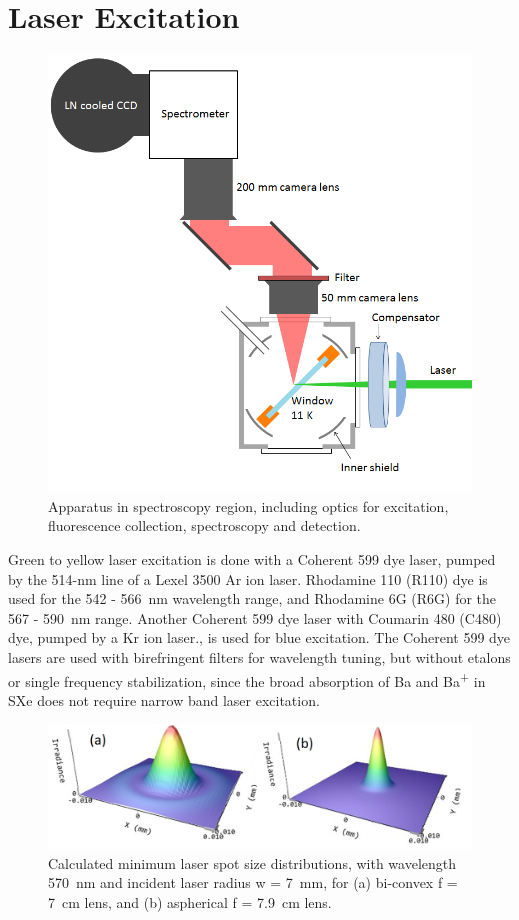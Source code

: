 \section{Laser Excitation}
\label{sec:laser}

\begin{figure} %
        \centering
                \includegraphics[width=.7\textwidth]{figures/window_etc_justOptics.png}
                \caption{Apparatus in spectroscopy region, including optics for excitation, fluorescence collection, spectroscopy and detection.}
\label{fig:endOfBeamOptics}
\end{figure}

Green to yellow laser excitation is done with a Coherent 599 dye laser, pumped by the 514-nm line of a Lexel 3500 Ar ion laser.  Rhodamine 110 (R110) dye is used for the 542 - 566~nm wavelength range, and Rhodamine 6G (R6G) for the 567 - 590~nm range.  Another Coherent 599 dye laser with Coumarin 480 (C480) dye, pumped by a Kr ion laser., is used for blue excitation.  The Coherent 599 dye lasers are used with birefringent filters for wavelength tuning, but without etalons or single frequency stabilization, since the broad absorption of Ba and Ba\textsuperscript{+} in SXe does not require narrow band laser excitation.

\begin{figure} %
        \centering
                \includegraphics[width=.7\textwidth]{figures/DFairbank_aber.png}
                \caption{Calculated minimum laser spot size distributions, with wavelength 570~nm and incident laser radius w = 7~mm, for (a) bi-convex f = 7~cm lens, and (b) aspherical f = 7.9~cm lens.  \cite{DFairbank}}
\label{fig:DFairbank}
\end{figure}

